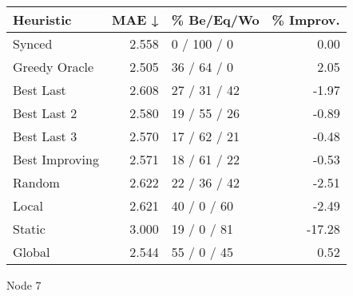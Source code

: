 \begin{tabular}{lrlr}
\toprule
\textbf{Heuristic} & \textbf{MAE ↓} & \textbf{\% Be/Eq/Wo} & \textbf{\% Improv.} \\
\midrule
            Synced &          2.558 &          0 / 100 / 0 &                0.00 \\
     Greedy Oracle &          2.505 &          36 / 64 / 0 &                2.05 \\
         Best Last &          2.608 &         27 / 31 / 42 &               -1.97 \\
       Best Last 2 &          2.580 &         19 / 55 / 26 &               -0.89 \\
       Best Last 3 &          2.570 &         17 / 62 / 21 &               -0.48 \\
    Best Improving &          2.571 &         18 / 61 / 22 &               -0.53 \\
            Random &          2.622 &         22 / 36 / 42 &               -2.51 \\
             Local &          2.621 &          40 / 0 / 60 &               -2.49 \\
            Static &          3.000 &          19 / 0 / 81 &              -17.28 \\
            Global &          2.544 &          55 / 0 / 45 &                0.52 \\
\bottomrule
\end{tabular}
\caption{Node 7}
\label{tab:hr_iid_lr05_le1_bs4_7}
